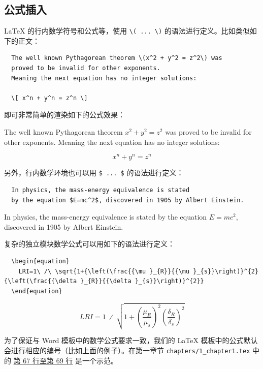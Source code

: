 \subsection{公式插入}

{\LaTeX} 的行内数学符号和公式等，使用 \verb|\( ... \)| 的语法进行定义。比如类似如下的正文：

\begin{verbatim}
  The well known Pythagorean theorem \(x^2 + y^2 = z^2\) was
  proved to be invalid for other exponents.
  Meaning the next equation has no integer solutions:

  \[ x^n + y^n = z^n \]
\end{verbatim}

即可非常简单的渲染如下的公式效果：

The well known Pythagorean theorem \(x^2 + y^2 = z^2\) was proved to be invalid for other exponents. Meaning the next equation has no integer solutions:

\[ x^n + y^n = z^n \]

另外，行内数学环境也可以用 \verb|$ ... $| 的语法进行定义：

\begin{verbatim}
  In physics, the mass-energy equivalence is stated
  by the equation $E=mc^2$, discovered in 1905 by Albert Einstein.
\end{verbatim}

In physics, the mass-energy equivalence is stated
by the equation $E=mc^2$, discovered in 1905 by Albert Einstein.

复杂的独立模块数学公式可以用如下的语法进行定义：

\begin{verbatim}
  \begin{equation}
    LRI=1\ ∕\ \sqrt{1+{\left(\frac{{\mu }_{R}}{{\mu }_{s}}\right)}^{2}{\left(\frac{{\delta }_{R}}{{\delta }_{s}}\right)}^{2}}
  \end{equation}
\end{verbatim}

\begin{equation}
  LRI=1\ ∕\ \sqrt{1+{\left(\frac{{\mu }_{R}}{{\mu }_{s}}\right)}^{2}{\left(\frac{{\delta }_{R}}{{\delta }_{s}}\right)}^{2}}
\end{equation}

为了保证与 Word 模板中的数学公式要求一致，我们的 {\LaTeX} 模板中的公式默认会进行相应的编号（比如上面的例子）。在第一章节 \texttt{chapters/1\_chapter1.tex} 中的 \href{https://github.com/spencerwooo/BIThesis/blob/master/graduation-thesis/chapters/1_chapter1.tex#L67-L69}{第 67 行至第 69 行} 是一个示范。

